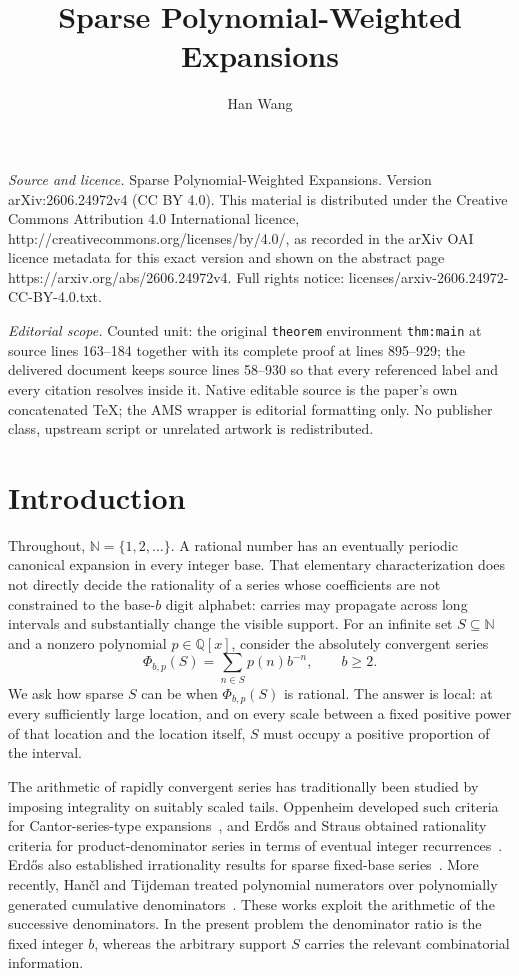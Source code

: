 \documentclass[10pt,a4paper]{amsart}
\newcommand{\N}{\mathbb N}
\newcommand{\Q}{\mathbb Q}
\begin{document}
\title[Sparse Polynomial-Weighted Expansions]{Sparse Polynomial-Weighted Expansions}
\author{Han Wang}
\date{}
\maketitle
\noindent\emph{Source and licence.} Sparse Polynomial-Weighted Expansions. Version arXiv:2606.24972v4 (CC BY 4.0). This material is distributed under the Creative Commons Attribution 4.0 International licence, http://creativecommons.org/licenses/by/4.0/, as recorded in the arXiv OAI licence metadata for this exact version and shown on the abstract page https://arxiv.org/abs/2606.24972v4. Full rights notice: licenses/arxiv-2606.24972-CC-BY-4.0.txt.\par\smallskip
\noindent\textit{Editorial scope.} Counted unit: the original \texttt{theorem} environment \texttt{thm:main} at source lines 163--184 together with its complete proof at lines 895--929; the delivered document keeps source lines 58--930 so that every referenced label and every citation resolves inside it. Native editable source is the paper's own concatenated TeX; the AMS wrapper is editorial formatting only. No publisher class, upstream script or unrelated artwork is redistributed.
\section{Introduction}

Throughout, $\N=\{1,2,\ldots\}$. A rational number has an eventually periodic
canonical expansion in every integer base. That elementary characterization
does not directly decide the rationality of a series whose coefficients are
not constrained to the base-$b$ digit alphabet: carries may propagate across
long intervals and substantially change the visible support. For an infinite set
$S\subseteq\N$ and a nonzero polynomial $p\in\Q[x]$, consider the absolutely
convergent series
\[
 \Phi_{b,p}(S)=\sum_{n\in S}p(n)b^{-n},\qquad b\ge2.
\]
We ask how sparse $S$ can be when $\Phi_{b,p}(S)$ is rational. The answer is
local: at every sufficiently large location, and on every scale between a
fixed positive power of that location and the location itself, $S$ must
occupy a positive proportion of the interval.

The arithmetic of rapidly convergent series has traditionally been studied
by imposing integrality on suitably scaled tails. Oppenheim developed such
criteria for Cantor-series-type expansions~\cite{Oppenheim1954}, and
Erd\H{o}s and Straus obtained rationality criteria for product-denominator
series in terms of eventual integer recurrences~\cite{ErdosStraus}. Erd\H{o}s
also established irrationality results for sparse fixed-base
series~\cite{Erdos1957}. More recently, Han\v{c}l and Tijdeman treated
polynomial numerators over polynomially generated cumulative
denominators~\cite{HanclTijdeman}. These works exploit the arithmetic of the
successive denominators. In the present problem the denominator ratio is the
fixed integer $b$, whereas the arbitrary support $S$ carries the relevant
combinatorial information.
\end{document}
